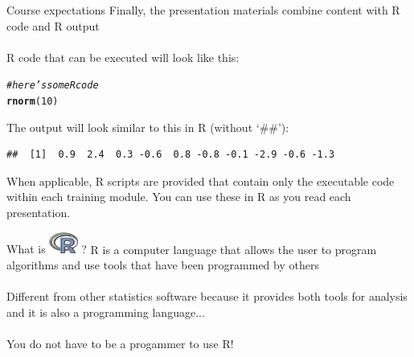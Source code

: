\documentclass[xcolor=svgnames]{beamer}\usepackage[]{graphicx}\usepackage[]{color}
\makeatletter
\newcommand{\hlnum}[1]{\textcolor[rgb]{0.686,0.059,0.569}{#1}}%
\newcommand{\hlcom}[1]{\textcolor[rgb]{0.678,0.584,0.686}{\textit{#1}}}%
\newcommand{\hlstd}[1]{\textcolor[rgb]{0.345,0.345,0.345}{#1}}%
\newcommand{\hlkwd}[1]{\textcolor[rgb]{0.737,0.353,0.396}{\textbf{#1}}}%
\newenvironment{kframe}{%
 \def\at@end@of@kframe{}%
 \ifinner\ifhmode%
  \def\at@end@of@kframe{\end{minipage}}%
  \begin{minipage}{\columnwidth}%
 \fi\fi%
 \def\FrameCommand##1{\hskip\@totalleftmargin \hskip-\fboxsep
 \colorbox{shadecolor}{##1}\hskip-\fboxsep
     \hskip-\linewidth \hskip-\@totalleftmargin \hskip\columnwidth}%
 \MakeFramed {\advance\hsize-\width
   \@totalleftmargin\z@ \linewidth\hsize
   \@setminipage}}%
 {\par\unskip\endMakeFramed%
 \at@end@of@kframe}
\newenvironment{knitrout}{}{} %
\makeatother
\begin{document}
\begin{frame}[containsverbatim]{Course expectations}
Finally, the presentation materials combine content with R code and R output\\~\\
R code that can be executed will look like this:
\begin{knitrout}\scriptsize
{}\color{fgcolor}\begin{kframe}
\begin{alltt}
\hlcom{# here's some R code}
\hlkwd{rnorm}\hlstd{(}\hlnum{10}\hlstd{)}
\end{alltt}
\end{kframe}
\end{knitrout}
The output will look similar to this in R (without `\#\#'):
\begin{knitrout}\scriptsize
{}\color{fgcolor}\begin{kframe}
\begin{verbatim}
##  [1]  0.9  2.4  0.3 -0.6  0.8 -0.8 -0.1 -2.9 -0.6 -1.3
\end{verbatim}
\end{kframe}
\end{knitrout}
When applicable, R scripts are provided that contain only the executable code within each training module.  You can use these in R as you read each presentation.
\end{frame}

\begin{frame}{What is \includegraphics[width=0.07\textwidth]{Rlogo.jpg} \hspace{0.2em}? }
R is a computer language that allows the user to program algorithms and use tools that have been programmed by others\\~\\
Different from other statistics software because it provides both tools for analysis and it is also a programming language...\\~\\
You do not have to be a progammer to use R!
\end{frame}
\end{document}
